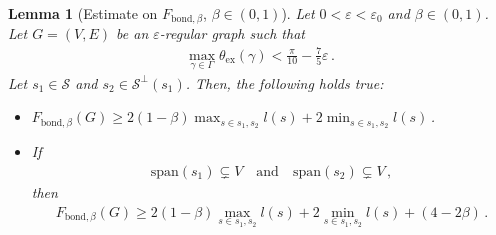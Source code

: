 \documentclass[reqno]{amsart}
\newcommand{\eps}{\varepsilon}
\theoremstyle{plain}
\newtheorem{lemma}[theorem]{Lemma}
\theoremstyle{definition}
\numberwithin{equation}{section}
\begin{document}
 

\begin{lemma}[Estimate on $F_{\mathrm{bond},\beta}$, $\beta \in (0,1)$]\label{lem:orthogonalstrata} Let $0 <\eps < \eps_0  $ and $\beta \in (0,1)$. Let  $G=(V,E)$ be an $\eps$-regular graph such that
\begin{align}\label{eq: smalli}
 \max_{\gamma \in \Gamma} \theta_{\mathrm{ex}}(\gamma) < \frac{\pi}{10}-  \frac{7}{5} \eps  \,.
\end{align}
Let $s_1 \in \mathcal{S}$ and $s_2 \in \mathcal{S}^\perp(s_1)$.  Then, the following holds true:
\begin{itemize}
\item[{\rm (i)}] $ F_{\mathrm{bond}, \beta }  (G) \geq 2(1-\beta) \max_{s \in s_1,s_2} l(s) + 2\min_{s \in s_1,s_2} l(s)$\,.
\item[{\rm (ii)}] If 
\begin{align}\label{incl:nospan}
\mathrm{span}(s_1)\subsetneq V  \quad \text{and}\quad \mathrm{span}(s_2)\subsetneq  V   \,,
\end{align}
then 
\begin{align*}
 F_{\mathrm{bond},\beta}  (G) \geq 2(1-\beta) \max_{s \in s_1,s_2} l(s) + 2\min_{s \in s_1,s_2} l(s) + (4- 2  \beta) \,.
\end{align*} 
\end{itemize}
\end{lemma}
\end{document}
